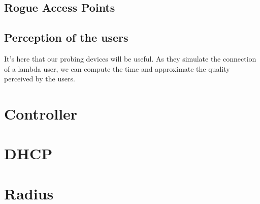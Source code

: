 \subsection{Rogue Access Points}
\subsection{Perception of the users}
It's here that our probing devices will be useful. As they simulate the connection of a lambda user, we can compute the time and approximate the quality perceived by the users. 

\section{Controller}

\section{DHCP}

\section{Radius}



